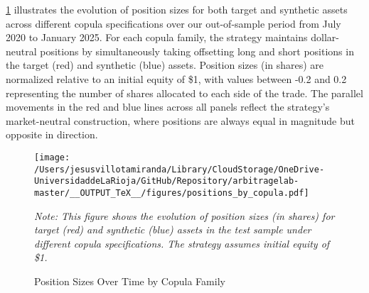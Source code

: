 \cref{fig:positions_by_copula} illustrates the evolution of position sizes for both target and synthetic assets across different copula specifications over our out-of-sample period from July 2020 to January 2025. For each copula family, the strategy maintains dollar-neutral positions by simultaneously taking offsetting long and short positions in the target (red) and synthetic (blue) assets. Position sizes (in shares) are normalized relative to an initial equity of \$1, with values between -0.2 and 0.2 representing the number of shares allocated to each side of the trade. The parallel movements in the red and blue lines across all panels reflect the strategy's market-neutral construction, where positions are always equal in magnitude but opposite in direction.

\begin{figure}[H]
  \caption{Position Sizes Over Time by Copula Family}
  \centering
  \texttt{[image: /Users/jesusvillotamiranda/Library/CloudStorage/OneDrive-UniversidaddeLaRioja/GitHub/Repository/arbitragelab-master/\_\_OUTPUT\_TeX\_\_/figures/positions\_by\_copula.pdf]}
  \label{fig:positions_by_copula}
\vspace{0.2cm}
\begin{minipage}{\textwidth}
\setlength{\parindent}{0pt}
\small\textit{Note: 
This figure shows the evolution of position sizes (in shares) for target (red) and synthetic (blue) assets in the test sample under different copula specifications. The strategy assumes initial equity of \$1.
}
\end{minipage}

\end{figure}


